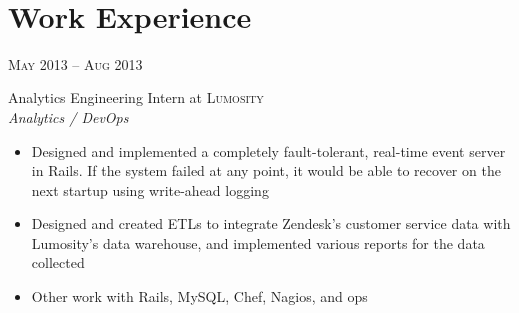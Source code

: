 \documentclass[10pt]{article} %
\begin{document}
\renewcommand{\labelitemi}{$\star$}

\color{text1} %


\par{\\ %
	

\begin{minipage}[t]{0.5\textwidth} %
\vspace{0pt} %
	

\section{Work Experience} 


{\raggedleft\textsc{May 2013 -- Aug 2013}\par}

{\raggedright\large Analytics Engineering Intern at \textsc{Lumosity}\\
\textit{Analytics / DevOps}\\[5pt]}

\normalsize{
  \begin{itemize}
  \item Designed and implemented a completely fault-tolerant, real-time
    event server in Rails. If the system failed at any point, it would be
    able to recover on the next startup using write-ahead logging
  \item Designed and created ETLs to integrate Zendesk's customer service
    data with Lumosity's data warehouse, and implemented various reports
    for the data collected
  \item Other work with Rails, MySQL, Chef, Nagios, and ops
  \end{itemize}
}\\


\end{minipage}}
\end{document}
